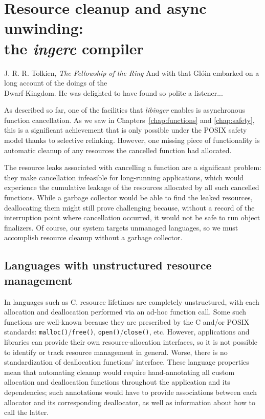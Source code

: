 \chapter{Resource cleanup and async unwinding: \\ the \textit{ingerc} compiler}
\label{chap:ingerc}

\ifdefined\chapquotes
\vspace{-1in}
\begin{chapquote}[1.75in]{J. R. R. Tolkien, \textit{The Fellowship of the Ring}}
And with that Gl\'oin embarked on a long account of the doings of the \\
Dwarf-Kingdom.  He was delighted to have found so polite a listener...
\end{chapquote}
\fi

As described so far, one of the facilities that \textit{libinger} enables is
asynchronous function cancellation.  As we saw in Chapters~\ref{chap:functions} and
\ref{chap:safety}, this is a significant achievement that is only possible under the
POSIX safety model thanks to selective relinking.  However, one missing piece of
functionality is automatic cleanup of any resources the cancelled function had
allocated.

The resource leaks associated with cancelling a function are a significant problem:\@
they make cancellation infeasible for long-running applications, which would
experience the cumulative leakage of the resources allocated by all such cancelled
functions.  While a garbage collector would be able to find the leaked resources,
deallocating them might still prove challenging because, without a record of the
interruption point where cancellation occurred, it would not be safe to run object
finalizers.  Of course, our system targets unmanaged languages, so we must accomplish
resource cleanup without a garbage collector.


\section{Languages with unstructured resource management}

In languages such as C, resource lifetimes are completely unstructured, with each
allocation and deallocation performed via an ad-hoc function call.  Some such
functions are well-known because they are prescribed by the C and/or POSIX standards:
\texttt{malloc()}/\texttt{free()}, \texttt{open()}/\texttt{close()}, etc.  However,
applications and libraries can provide their own resource-allocation interfaces, so
it is not possible to identify or track resource management in general.  Worse, there
is no standardization of deallocation functions' interface.  These language
properties mean that automating cleanup would require hand-annotating all custom
allocation and deallocation functions throughout the application and its
dependencies; such annotations would have to provide associations between each
allocator and its corresponding deallocator, as well as information about how to call
the latter.

